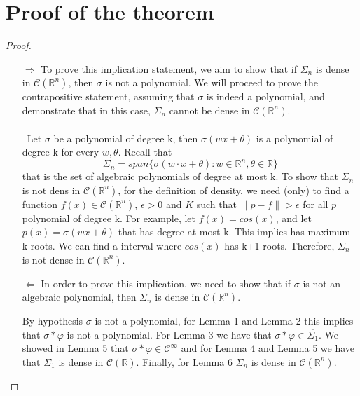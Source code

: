 \documentclass[../main.tex]{subfiles}
\begin{document}
\section{Proof of the theorem}
	\begin{proof}~ %

	\begin{enumerate}
		\item[$\Rightarrow$] 
		To prove this implication statement, we aim to show that if $\Sigma_n$ is dense in $\mathcal{C}(\mathbb{R}^n)$, then $\sigma$ is not a polynomial.
		 We will proceed to prove the contrapositive statement, assuming that $\sigma$ is indeed a polynomial, and demonstrate that in this case, $\Sigma_n$ cannot be dense in $\mathcal{C}(\mathbb{R}^n)$. \\ \\ Let $\sigma$ be a polynomial of degree k, then $\sigma(wx+\theta)$ is a polynomial  of degree k for every $w,\theta$. Recall that $$ \Sigma_n = span\{\sigma(w\cdot x + \theta) : w\in \mathbb{R}^n, \theta \in \mathbb{R} \}$$  that is the set of algebraic polynomials of degree at most k. To show that $\Sigma_n$ is not dens in $\mathcal{C}(\mathbb{R}^n)$, for the definition of density, we need (only) to find a function $f(x)\in \mathcal{C}(\mathbb{R}^n)$, $\epsilon > 0$ and $K$ such that  $\| p-f \| > \epsilon$ for all $p$ polynomial of degree k. For example, let $f(x)=cos(x)$, and let $p(x)= \sigma(wx+\theta)$ that has degree at most k. This implies has maximum k roots. We can find a interval where $cos(x)$ has k+1 roots. Therefore, $\Sigma_n$ is not dense in $\mathcal{C}(\mathbb{R}^n)$. 

		\item[$\Leftarrow$]  In order to prove this implication, we need to show that if $\sigma$ is not an algebraic polynomial, then $\Sigma_n$ is dense in $\mathcal{C}(\mathbb{R}^n)$.
		
		
		 By hypothesis $\sigma$ is not a polynomial, for Lemma 1 and Lemma 2 this implies that $\sigma \ast \varphi$ is not a polynomial. For Lemma 3 we have that $\sigma \ast \varphi \in \overline{\Sigma_1}$. We showed in Lemma 5 that $\sigma \ast \varphi \in \mathcal{C}^\infty$ and for Lemma 4 and  Lemma 5 we have that $\Sigma_1$ is dense in $\mathcal{C}(\mathbb{R})$. Finally, for Lemma 6 $\Sigma_n$ is dense in $\mathcal{C}(\mathbb{R}^n)$.
	\end{enumerate}
\end{proof}

	\cite{leshno1993multilayer}
\end{document}
